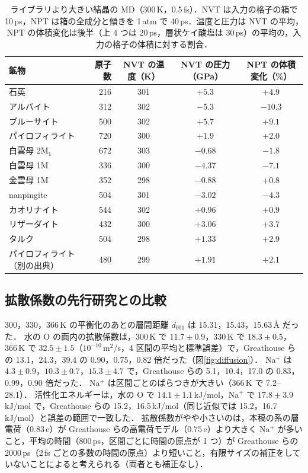 \documentclass[a4paper,11pt]{article}
\newcommand{\e}{\,e}
\begin{document}
\begin{table}[!htbp]
\centering
\caption{ライブラリより大きい結晶の MD（300\,K，0.5\,fs）．NVT は入力の格子の箱で 10\,ps，NPT は箱の全成分と傾きを 1\,atm で 40\,ps．温度と圧力は NVT の平均，NPT の体積変化は後半（上 4 つは 20\,ps，層状ケイ酸塩は 30\,ps）の平均の，入力の格子の体積に対する割合．}
\label{tab:bulkmd}
\small
\begin{tabular}{lrccc}
\toprule
鉱物 & 原子数 & NVT の温度（K） & NVT の圧力（GPa） & NPT の体積変化（\%） \\
\midrule
石英 & 216 & 301 & $+5.3$ & $+4.9$ \\
アルバイト & 312 & 302 & $-5.3$ & $-10.3$ \\
ブルーサイト & 500 & 302 & $+5.7$ & $+9.1$ \\
パイロフィライト & 720 & 300 & $+1.9$ & $+2.0$ \\
\midrule
白雲母 2M$_1$ & 672 & 303 & $-0.68$ & $-1.8$ \\
白雲母 1M & 336 & 300 & $-4.37$ & $-7.1$ \\
金雲母 1M & 352 & 298 & $-0.88$ & $+0.8$ \\
nanpingite & 504 & 301 & $-3.02$ & $-4.3$ \\
カオリナイト & 544 & 302 & $+0.96$ & $+0.9$ \\
リザーダイト & 432 & 300 & $+3.06$ & $+3.7$ \\
タルク & 504 & 298 & $+1.33$ & $+2.9$ \\
パイロフィライト（別の出典） & 480 & 299 & $+1.91$ & $+2.1$ \\
\bottomrule
\end{tabular}
\end{table}

\subsection{拡散係数の先行研究との比較}
\label{sec:resdiff}
300，330，366\,K の平衡化のあとの層間距離 $d_{001}$ は 15.31，15.43，15.63\,\AA{} だった．
水の O の面内の拡散係数は，300\,K で $11.7\pm0.9$，330\,K で $18.3\pm0.5$，366\,K で $32.5\pm1.5$（$10^{-10}$\,m$^2$/s，4 区間の平均と標準誤差）で，Greathouse ら\cite{greathouse2016}の 13.1，24.3，39.4 の 0.90，0.75，0.82 倍だった（図\ref{fig:diffusion}）．
Na$^+$ は $4.3\pm0.9$，$10.3\pm0.7$，$15.3\pm4.7$ で，Greathouse らの 5.1，10.4，17.0 の 0.83，0.99，0.90 倍だった．
Na$^+$ は区間ごとのばらつきが大きい（366\,K で 7.2--28.1）．
活性化エネルギーは，水の O で $14.1\pm1.1$\,kJ/mol，Na$^+$ で $17.8\pm3.9$\,kJ/mol で，Greathouse らの 15.2，16.5\,kJ/mol（同じ近似では 15.2，16.7\,kJ/mol）と誤差の範囲で一致した．
拡散係数がやや小さいのは，本稿の系の層電荷（$0.83$\e）が Greathouse らの高電荷モデル（$0.75$\e）より大きく Na$^+$ が多いこと，平均の時間（800\,ps，区間ごとに時間の原点が 1 つ）が Greathouse らの 2000\,ps（2\,fs ごとの多数の時間の原点）より短いこと，有限サイズの補正をしていないことによると考えられる（両者とも補正なし）．
\end{document}
